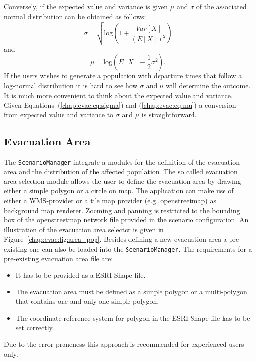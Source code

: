 Conversely, if the expected value and variance is given $\mu$ and $\sigma$ of the associated normal distribution can be obtained as follows:
\begin{equation}
\sigma = \sqrt{\text{log}(1+\frac{Var[X]}{(E[X])^2})}\label{chap:evac:eq:sigma}
\end{equation}
and 
\begin{equation}
\mu = \text{log}(E[X] - \frac{1}{2}\sigma^2).\label{chap:evac:eq:mu}
\end{equation}
If the users wishes to generate a population with departure times that follow a log-normal distribution it is hard to see how $\sigma$ and $\mu$ will determine the outcome. It is much more convenient to think about the expected value and variance. Given Equations~(\ref{chap:evac:eq:sigma}) and (\ref{chap:evac:eq:mu}) a conversion from expected value and variance to $\sigma$ and $\mu$ is straightforward.

\subsection{Evacuation Area}%
The \verb+ScenarioManager+ integrate a modules for the definition of the evacuation area and the distribution of the affected population. The so called evacuation area selection module allows the user to define the evacuation area by drawing either a simple polygon or a circle on map. The application can make use of either a WMS-provider or a tile map provider (e.g.,\,openstreetmap) as background map renderer. Zooming and panning is restricted to the bounding box of the openstreetmap network file provided in the scenario configuration. An illustration of the evacuation area selector is given in Figure~\ref{chap:evac:fig:area_pop}. Besides defining a new evacuation area a pre-existing one can also be loaded into the \verb+ScenarioManager+. The requirements for a pre-existing evacuation area file are:
\begin{itemize}
\item It has to be provided as a ESRI-Shape file.
\item The evacuation area must be defined as a simple polygon or a multi-polygon that contains one and only one simple polygon.
\item The coordinate reference system for polygon in the ESRI-Shape file has to be set correctly. 
\end{itemize}
Due to the error-proneness this approach is recommended for experienced users only.

